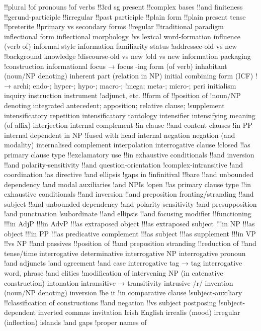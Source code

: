 !!plural
!of pronouns
!of verbs
!!3rd sg present
!!complex bases
!!and finiteness
!!gerund-participle
!!irregular
!!past participle
!!plain form
!!plain present tense
!!preterite
!!primary vs secondary forms
!!regular
!!traditional paradigm
inflectional form
inflectional morphology
!vs lexical word-formation
influence (verb of)
informal style
information familiarity status
!addressee-old vs new
!background knowledge
!discourse-old vs new
!old vs new
information packaging
!construction
informational focus → focus
-ing form (of verb)
inhabitant (noun/NP denoting)
inherent part (relation in NP)
initial combining form (ICF)
!→ archi; endo-; hyper-; hypo-; macro-;
!mega; meta-; micro-; peri
initialism
inquiry
instruction
instrument
!adjunct, etc.
!!form of
!!position of
!noun/NP denoting
integrated antecedent; apposition; relative clause;
!supplement
intensificatory repetition
intensificatory tautology
intensifier
intensifying meaning (of affix)
interjection
internal complement
!in clause
!!and content clauses
!in PP
internal dependent in NP
!fused with head
internal negation negation (and modality)
internalised complement
interpolation
interrogative clause
!closed
!!as primary clause type
!!exclamatory use
!!in exhaustive conditionals
!!and inversion
!!and polarity-sensitivity
!!and question-orientation
!complex-intransitive
!and coordination
!as directive
!and ellipsis
!gaps in
!infinitival
!!bare
!!and unbounded dependency
!and modal auxiliaries
!and NPIs
!open
!!as primary clause type
!!in exhaustive conditionals
!!and inversion
!!and preposition fronting/stranding
!!and subject
!!and unbounded dependency
!and polarity-sensitivity
!and presupposition
!and punctuation
!subordinate
!!and ellipsis
!!and focusing modifier
!!functioning
!!!in AdjP
!!!in AdvP
!!!as extraposed object
!!!as extraposed subject
!!!in NP
!!!as object
!!!in PP
!!!as predicative complement
!!!as subject
!!!as supplement
!!!in VP
!!vs NP
!!and passives
!!position of
!!and preposition stranding
!!reduction of
!!and tense/time
interrogative determinative
interrogative NP
interrogative pronoun
!and adjuncts
!and agreement
!and case
interrogative tag → tag
interrogative word, phrase
!and clitics
!modification of
intervening NP (in catenative construction)
intonation
intransitive → transitivity
intrusive /r/
invention (noun/NP denoting)
inversion
!be it
!in comparative clause
!subject-auxiliary
!!classification of constructions
!!and negation
!!vs subject postposing
!subject-dependent
inverted commas
invitation
Irish English
irrealis (mood)
irregular (inflection)
islands
!and gaps
!proper names of
